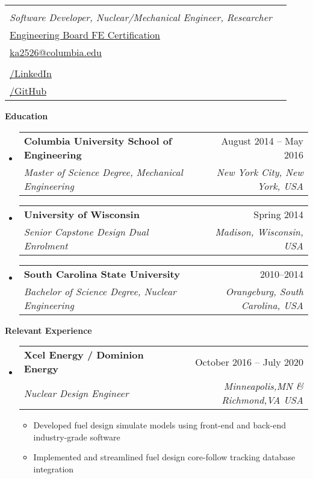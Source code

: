 \documentclass[letterpaper,12pt]{article}[leftmargin=*]
\makeatletter
\def \fullname {Kwadwo Adutwum}
\def \subtitle {Software Developer, Nuclear/Mechanical Engineer, Researcher}
\def \linkedinicon {\faLinkedin}
\def \linkedinlink {https://www.linkedin.com/in/kwadwoadutwum/}
\def \linkedintext {/LinkedIn}
\def \phoneicon {\faMobilePhone}
\def \phonetext {Cell: +1-(410)-402-3731}
\def \emailicon {\faEnvelope}
\def \emaillink {mailto:ka2526@columbia.edu}
\def \emailtext {ka2526@columbia.edu}
\def \githubicon {\faGithub}
\def \githublink {https://github.com/uptimistic}
\def \githubtext {/GitHub}
\def \websiteicon {\faGlobe}
\def \websitelink {https://account.ncees.org/rn/1744729-1038995-bb37253}
\def \websitetext { Engineering Board FE Certification}
\def \homeaddressicon {\faHome}
\def \homeaddresstext {Valley Creek Apt, Woodbury,MN 55125}
\def \headertype {\singlecol} %
\def \entryspacing {-0pt}
\def \linkedin {\linkedinicon \hspace{3pt}\href{\linkedinlink}{\linkedintext}}
\def \phone {\phoneicon \hspace{3pt}{ \phonetext}}
\def \email {\emailicon \hspace{3pt}\href{\emaillink}{\emailtext}}
\def \github {\githubicon \hspace{3pt}\href{\githublink}{\githubtext}}
\def \homeaddress {\homeaddressicon \hspace{3pt}{ \homeaddresstext}}
\def \website {\websiteicon \hspace{3pt}\href{\websitelink}{\websitetext}}
\renewcommand{\section}[2]{\vspace{5pt}
  \colorbox{secondary}{\color{white}\raggedbottom\normalsize\textbf{{#1}{\hspace{7pt}#2}}}
}
\newcommand{\resumeEntryStart}{\begin{itemize}[leftmargin=2.5mm]}
\newcommand{\resumeEntryEnd}{\end{itemize}\vspace{\entryspacing}}
\newcommand{\resumeItemListStart}{\begin{itemize}[leftmargin=4.5mm]}
\newcommand{\resumeItemListEnd}{\end{itemize}}
\newcommand{\resumeItem}[1]{
  \item\small{
    {#1 \vspace{-2pt}}
  }
}
\newcommand{\resumeEntryTSDL}[4]{
  \vspace{-1pt}\item[]
    \begin{tabularx}{0.97\textwidth}{X@{\hspace{60pt}}r}
      \textbf{\color{primary}#1} & {\firabook\color{accent}\small#2} \\
      \textit{\color{accent}\small#3} & \textit{\color{accent}\small#4} \\
    \end{tabularx}\vspace{-6pt}
}
\newcommand{\doublecol}[6]{
  \begin{tabularx}{\textwidth}{Xr}
    {
      \begin{tabular}[c]{l}
        \fontsize{35}{45}\selectfont{\color{primary}{{\textbf{\fullname}}}} \\
        {\textit{\subtitle}} %
      \end{tabular}
    } & {
      \begin{tabular}[c]{l@{\hspace{1.5em}}l}
        {\small#4} & {\small#1} \\
        {\small#5} & {\small#2} \\
        {\small#6} & {\small#3}
      \end{tabular}
    }
  \end{tabularx}
}
\newcommand{\singlecol}[6]{
  \begin{tabularx}{\textwidth}{Xr}
    {
      \begin{tabular}[b]{l}
        \fontsize{35}{45}\selectfont{\color{primary}{{\textbf{\fullname}}}} \\
        {\textit{\subtitle}} %
      \end{tabular}
    } & {
      \begin{tabular}[c]{l}
        {\small#1} \\
        {\small#2} \\
        {\small#3} \\
        {\small#4} \\
        {\small#5} \\
        {\small#6}
      \end{tabular}
    }
  \end{tabularx}
}
\makeatother
\begin{document}


\headertype{\homeaddress}{\website}{\email}{\phone}{\linkedin}{\github}{} %
\vspace{-10pt} %



\section{\faUniversity}{Education}

  \resumeEntryStart
    \resumeEntryTSDL
      {Columbia University School of Engineering}{August 2014 -- May 2016}
      {Master of Science Degree, Mechanical Engineering}
      {New York City, New York, USA}
      
    \resumeEntryTSDL
    { University of Wisconsin}{Spring 2014 }
    { Senior Capstone Design Dual Enrolment}
    {Madison, Wisconsin, USA}

    \resumeEntryTSDL
    { South Carolina State University}{2010--2014 }
    {Bachelor of Science Degree, Nuclear Engineering}
    {Orangeburg, South Carolina, USA}
 
    

    
      \resumeEntryEnd

\section{\faPieChart}{Relevant Experience}

  \resumeEntryStart
    \resumeEntryTSDL
      {Xcel Energy / Dominion Energy }{October 2016 -- July 2020}
      {Nuclear Design Engineer }{Minneapolis,MN \& Richmond,VA USA}
    \resumeItemListStart
      \resumeItem {Developed fuel design simulate models using front-end and back-end industry-grade software}
      \resumeItem {Implemented and streamlined fuel design core-follow tracking database integration }
    \resumeItemListEnd
  \resumeEntryEnd
\end{document}
